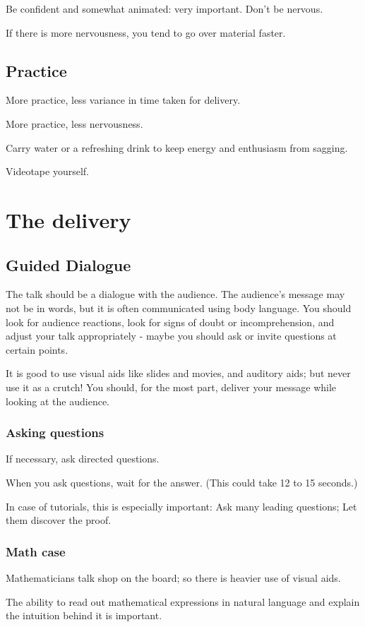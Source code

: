 \documentclass[oneside, article]{memoir}
\begin{document}
Be confident and somewhat animated: very important. Don't be nervous.

If there is more nervousness, you tend to go over material faster.

\subsection{Practice}
More practice, less variance in time taken for delivery.

More practice, less nervousness.

Carry water or a refreshing drink to keep energy and enthusiasm from sagging.

Videotape yourself.

\section{The delivery}
\subsection{Guided Dialogue}
The talk should be a dialogue with the audience. The audience's message may not be in words, but it is often communicated using body language. You should look for audience reactions, look for signs of doubt or incomprehension, and adjust your talk appropriately - maybe you should ask or invite questions at certain points.

It is good to use visual aids like slides and movies, and auditory aids; but never use it as a crutch! You should, for the most part, deliver your message while looking at the audience.

\subsubsection{Asking questions}
If necessary, ask directed questions.

When you ask questions, wait for the answer. (This could take 12 to 15 seconds.)

In case of tutorials, this is especially important: Ask many leading questions; Let them discover the proof.

\subsubsection{Math case}
Mathematicians talk shop on the board; so there is heavier use of visual aids.

The ability to read out mathematical expressions in natural language and explain the intuition behind it is important.
\end{document}
